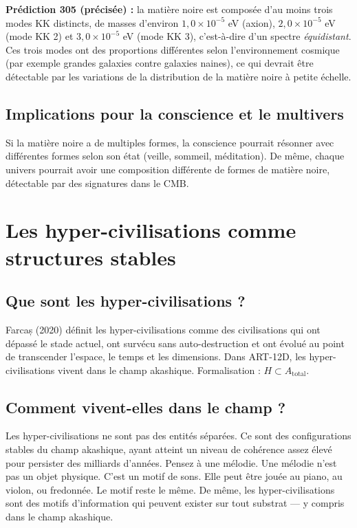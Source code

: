 \textbf{Prédiction 305 (précisée) :} la matière noire est composée d'au moins trois modes KK distincts, de masses d'environ $1,0\times10^{-5}$ eV (axion), $2,0\times10^{-5}$ eV (mode KK 2) et $3,0\times10^{-5}$ eV (mode KK 3), c'est-à-dire d'un spectre \emph{équidistant}. Ces trois modes ont des proportions différentes selon l'environnement cosmique (par exemple grandes galaxies contre galaxies naines), ce qui devrait être détectable par les variations de la distribution de la matière noire à petite échelle.

\subsection{Implications pour la conscience et le multivers}
Si la matière noire a de multiples formes, la conscience pourrait résonner avec différentes formes selon son état (veille, sommeil, méditation). De même, chaque univers pourrait avoir une composition différente de formes de matière noire, détectable par des signatures dans le CMB.

\section{Les hyper-civilisations comme structures stables}
\subsection{Que sont les hyper-civilisations ?}
Farcaș (2020) définit les hyper-civilisations comme des civilisations qui ont dépassé le stade actuel, ont survécu sans auto-destruction et ont évolué au point de transcender l'espace, le temps et les dimensions. Dans ART-12D, les hyper-civilisations vivent dans le champ akashique. Formalisation : $H \subset A_{\text{total}}$.

\subsection{Comment vivent-elles dans le champ ?}
Les hyper-civilisations ne sont pas des entités séparées. Ce sont des configurations stables du champ akashique, ayant atteint un niveau de cohérence assez élevé pour persister des milliards d'années. Pensez à une mélodie. Une mélodie n'est pas un objet physique. C'est un motif de sons. Elle peut être jouée au piano, au violon, ou fredonnée. Le motif reste le même. De même, les hyper-civilisations sont des motifs d'information qui peuvent exister sur tout substrat --- y compris dans le champ akashique.

